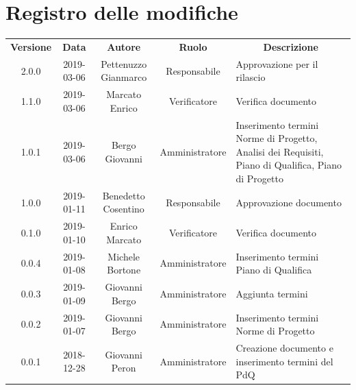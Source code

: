 \renewcommand {\footrulewidth}{0.2mm}

\usepackage{lipsum}

	
	{\def\arraystretch{2}\tabcolsep=10pt
	\newpage
	\section*{\centering Registro delle modifiche}
	\begin{tabularx}{\textwidth}{ c | c | c | c | X }
		\rowcolor{LightBlue}
		\color{white}\bfseries Versione & \color{white}\bfseries Data & \color{white}\bfseries Autore & \color{white}\bfseries Ruolo & \multicolumn{1}{c}{\color{white}\bfseries Descrizione}\\[0.25cm]
		2.0.0 & 2019-03-06 & Pettenuzzo Gianmarco & Responsabile & Approvazione per il rilascio \\ 
		\hline
		1.1.0 & 2019-03-06 & Marcato Enrico & Verificatore & Verifica documento \\ 
		\hline
		1.0.1 & 2019-03-06 & Bergo Giovanni & Amministratore & Inserimento termini Norme di Progetto, Analisi dei Requisiti, Piano di Qualifica, Piano di Progetto \\ 
		\hline
		1.0.0 & 2019-01-11 & Benedetto Cosentino & Responsabile & Approvazione documento \\ 
		\hline
		0.1.0 & 2019-01-10 & Enrico Marcato & Verificatore & Verifica documento \\ 
		\hline
		0.0.4 & 2019-01-08 & Michele Bortone & Amministratore & Inserimento termini Piano di Qualifica \\ 
		\hline 
		0.0.3 & 2019-01-09 & Giovanni Bergo & Amministratore & Aggiunta termini \\ 
		\hline 
		0.0.2 & 2019-01-07 & Giovanni Bergo & Amministratore & Inserimento termini Norme di Progetto \\ 
		\hline 
		0.0.1 & 2018-12-28 & Giovanni Peron & Amministratore & Creazione documento e \newline inserimento termini del PdQ \\ 
		\hline
	
	\end{tabularx}
	\newpage
	\setcounter{secnumdepth}{0}
	
	
	\printindex
	\newpage
}
